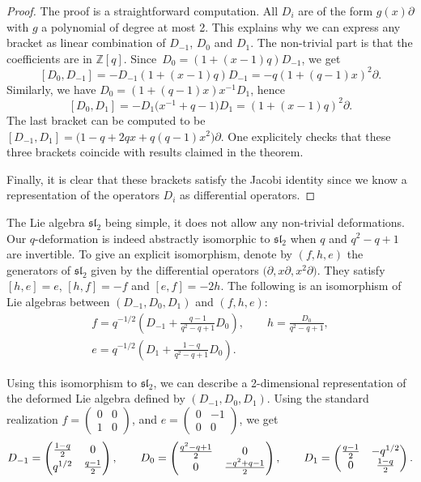\documentclass[pdftex]{sigma}
\numberwithin{equation}{section}
\newcommand*{\Z}{\mathbb{Z}}
\begin{document}
\begin{proof}
The proof is a straightforward computation. All $D_i$ are of the form $g(x)\partial$ with $g$ a polynomial of degree at most 2. This explains why we can express any bracket as linear combination of $D_{-1}$, $D_0$ and $D_1$. The non-trivial part is that the coefficients are in $\Z[q]$.
Since~${D_0=(1+(x-1)q)D_{-1}}$, we get
\[[D_0,D_{-1}]=-D_{-1}(1+(x-1)q)D_{-1}=-q(1+(q-1)x)^2\partial.
\]
Similarly, we have $D_0=(1+(q-1)x)x^{-1}D_1$, hence
\[
[D_0,D_1]=-D_1\big(x^{-1}+q-1\big)D_1=(1+(x-1)q)^2\partial.
\]
The last bracket can be computed to be $[D_{-1},D_1]=\big(1-q+2qx+q(q-1)x^2\big)\partial$. One explicitely checks that these three brackets coincide with results claimed in the theorem.

Finally, it is clear that these brackets satisfy the Jacobi identity since we know a representation of the operators $D_i$ as differential operators.
\end{proof}

The Lie algebra $\mathfrak{sl}_2$ being simple, it does not allow any non-trivial deformations. Our $q$-deformation is indeed abstractly isomorphic to $\mathfrak{sl}_2$ when $q$ and $q^2-q+1$ are invertible. To give an explicit isomorphism, denote by $(f,h,e)$ the generators of $\mathfrak{sl}_2$ given by the differential operators $\big(\partial, x\partial, x^2\partial\big)$. They satisfy $[h,e]=e$, $[h,f]=-f$ and $[e,f]=-2h$. The following is an isomorphism of Lie algebras between $(D_{-1},D_0,D_1)$ and $(f,h,e)$:
\begin{gather*}%
f=q^{-1/2}\left(D_{-1}+\frac{q-1}{q^2-q+1}D_0\right), \qquad h=\frac{D_0}{q^2-q+1}, \\
 e=q^{-1/2}\left(D_1+\frac{1-q}{q^2-q+1}D_0\right).
\end{gather*}

Using this isomorphism to $\mathfrak{sl}_2$, we can describe a 2-dimensional representation of the deformed Lie algebra defined by $(D_{-1}, D_0, D_1)$. Using the standard realization $f=\left(\begin{smallmatrix}0 & 0 \\1 & 0\end{smallmatrix}\right)$,  and $e=\left(\begin{smallmatrix}0 & -1 \\0 & 0\end{smallmatrix}\right)$, we get
\[
D_{-1}=\begin{pmatrix}\tfrac{1-q}{2}&0\vspace{1mm} \\q^{1/2} & \tfrac{q-1}{2}\end{pmatrix}, \qquad D_0=\begin{pmatrix}\tfrac{q^2-q+1}{2}&0\\0 & \tfrac{-q^2+q-1}{2}\end{pmatrix}, \qquad D_{1}=\begin{pmatrix}\tfrac{q-1}{2}& -q^{1/2}\\0 & \tfrac{1-q}{2}\end{pmatrix}.
\]
\end{document}
